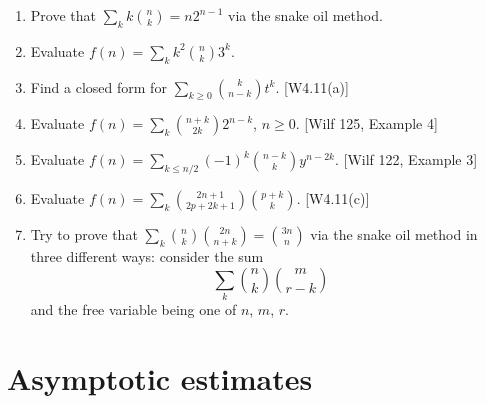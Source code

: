 \documentclass[10pt, a4paper]{article}
\newcommand*\ruleline[1]{\par\noindent\raisebox{.8ex}{\makebox[\linewidth]{\hrulefill\hspace{1ex}\raisebox{-.8ex}{#1}\hspace{1ex}\hrulefill}}}
\def\ans#1{\big[\hskip 2mm {#1}\hskip 2mm\big]}
\begin{document}
\ruleline{Exercises}
\begin{enumerate}
    \item Prove that $\sum_k k{n\choose k} = n2^{n-1}$ via the snake oil method.
            \ans{$L(x) = P(x) = {x\over (1-2x)^2}$}
    \item Evaluate $\displaystyle f(n)=\sum_k k^2{n\choose k}3^k$. \\[2mm]
            \ans{$F(x)={3x(1+2x)\over (1-4x)^3}={3/8\over 1-4x}-{3/2\over (1-4x)^2}+{9/8\over (1-4x)^3}$; $f(n)=3\cdot 4^{n-2}\cdot n(1+3n)$}
    \item Find a closed form for $\displaystyle \sum_{k\ge 0} {k\choose n-k}t^k$. [W4.11(a)] \\[2mm]
            \ans{$F(x)=1/(1-tx-tx^2)$}
    \item Evaluate $\displaystyle f(n)=\sum_k {n+k\choose 2k}2^{n-k}$, $n\ge 0$. [Wilf 125, Example 4] \\[2mm]
            \ans{$F(x)={1-2x\over (1-x)(1-4x)}={2\over 3(1-4x)}+{1\over 3(1-x)}$; $f(n)=(2^{2n+1}+1)/3$}
    \item Evaluate $\displaystyle f(n)=\sum_{k\le n/2} (-1)^k{n-k\choose k}y^{n-2k}$. [Wilf 122, Example 3]\\[2mm]
            \ans{$F(x)=1/(1-xy+x^2)$}
    \item Evaluate $\displaystyle f(n)=\sum_{k} {2n+1\choose 2p+2k+1}{p+k\choose k}$. [W4.11(c)]\\[2mm]
            \ans{replace $2n+1$ by $m$ and solve for $f(m)={m-p-1\choose p}2^{m-2p-1}$;  $f(2n+1)={2n-p\choose p}4^{n-p}$;\\[2mm]
                $\displaystyle F(x) = {x\over (1-x)^2}\sum_{k\ge 0} {p+k\choose p} \left({x\over 1-x}\right)^{2(p+k)}
                = {x^{p+1}\over 2^p}\cdot {(2x)^p\over (1-2x)^{p+1}}$}
    \item Try to prove that $\sum_k {n\choose k}{2n\choose n+k}={3n\choose n}$ via the snake oil method in three different ways: consider the sum
            $$\sum_k {n\choose k}{m\choose r-k}$$
            and the free variable being one of $n$, $m$, $r$.
\end{enumerate}


\newpage


\section{Asymptotic estimates}
\end{document}
